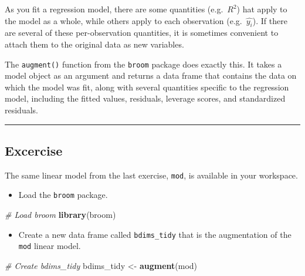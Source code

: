 \documentclass[
]{book}
\newenvironment{Shaded}{\begin{snugshade}}{\end{snugshade}}
\newcommand{\CommentTok}[1]{\textcolor[rgb]{0.56,0.35,0.01}{\textit{#1}}}
\newcommand{\KeywordTok}[1]{\textcolor[rgb]{0.13,0.29,0.53}{\textbf{#1}}}
\newcommand{\NormalTok}[1]{#1}
\newcommand{\StringTok}[1]{\textcolor[rgb]{0.31,0.60,0.02}{#1}}
\providecommand{\tightlist}{%
  \setlength{\itemsep}{0pt}\setlength{\parskip}{0pt}}
\begin{document}
As you fit a regression model, there are some quantities (e.g.~\(R^2\)) hat apply to the model as a whole, while others apply to each observation (e.g.~\(\hat{y_i}\)). If there are several of these per-observation quantities, it is sometimes convenient to attach them to the original data as new variables.

The \texttt{augment()} function from the \texttt{broom} package does exactly this. It takes a model object as an argument and returns a data frame that contains the data on which the model was fit, along with several quantities specific to the regression model, including the fitted values, residuals, leverage scores, and standardized residuals.

\begin{center}\rule{0.5\linewidth}{0.5pt}\end{center}

\hypertarget{excercise-2}{%
\subsection*{Excercise}\label{excercise-2}}

The same linear model from the last exercise, \texttt{mod}, is available in your workspace.

\begin{itemize}
\tightlist
\item
  Load the \texttt{broom} package.
\end{itemize}

\begin{Shaded}
\begin{Highlighting}[]
\CommentTok{# Load broom}
\KeywordTok{library}\NormalTok{(broom)}
\end{Highlighting}
\end{Shaded}

\begin{itemize}
\tightlist
\item
  Create a new data frame called \texttt{bdims\_tidy} that is the augmentation of the \texttt{mod} linear model.
\end{itemize}

\begin{Shaded}
\begin{Highlighting}[]
\CommentTok{# Create bdims_tidy}
\NormalTok{bdims_tidy <-}\StringTok{ }\KeywordTok{augment}\NormalTok{(mod)}
\end{Highlighting}
\end{Shaded}
\end{document}
